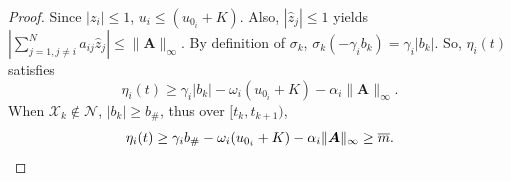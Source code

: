 \documentclass[conference]{IEEEtran}
\begin{document}
\begin{proof}
    Since $|z_i| \leq 1$, $u_i \leq (u_{0_i} + K)$. Also, 
    $|\hat{z}_j| \leq 1$ yields $|\sum^N_{j = 1, j\neq i}a_{ij}\hat{z}_j| \leq \|\boldsymbol{A}\|_{\infty}$. By definition of $\sigma_k$, $\sigma_k(-\gamma_i b_k) = \gamma_i|b_k|$. So, $\eta_i(t)$ satisfies
    \begin{equation*}
        \eta_i(t) \ge \gamma_i|b_k| - \omega_i(u_{0_i} + K) - \alpha_i\|\boldsymbol{A}\|_{\infty}.
    \end{equation*}
    When $\mathcal{X}_k \notin \mathcal{N}$, $|b_k| \ge b_{\#}$, thus over $[t_k, t_{k+1})$,
    \begin{equation*}
        \eta_i(t) \ge \gamma_i b_{\#} - \omega_i(u_{0_i} + K) - \alpha_i\|\boldsymbol{A}\|_{\infty} \ge \overline{m}. \qedhere
    \end{equation*}
\end{proof}
\end{document}
